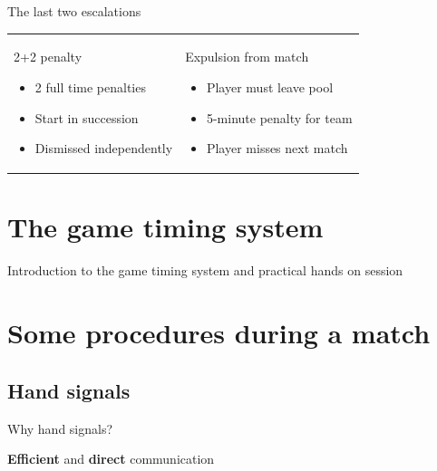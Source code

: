 \documentclass{beamer}
\begin{document}
	\begin{frame}{The last two escalations}
		\begin{tabular}{ll}
			\parbox{0.5\textwidth}
			{
				\begin{center}
					2+2 penalty
				\end{center}
				\begin{itemize}
					\item 2 full time penalties
					\item Start in succession
					\item Dismissed independently
				\end{itemize}
			}
			&
			\parbox{0.5\textwidth}
			{
				\begin{center}
					Expulsion from match
				\end{center}
				\begin{itemize}
					\item Player must leave pool
					\item 5-minute penalty for team
					\item Player misses next match
				\end{itemize}
			}
		\end{tabular}
	\end{frame}

	\section{The game timing system}
	\begin{frame}
		\begin{center}
			Introduction to the game timing system and practical hands on session
		\end{center}
	\end{frame}

	\section{Some procedures during a match}
	\subsection{Hand signals}

	\begin{frame}{Why hand signals?}
		\begin{center}
			\textbf{Efficient} and \textbf{direct} communication
		\end{center}
	\end{frame}
\end{document}
